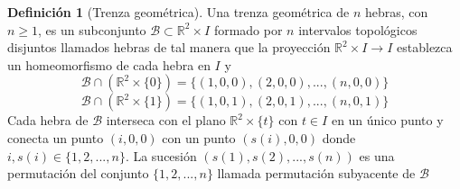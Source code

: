 \documentclass[12pt]{article}
\theoremstyle{definition}
\newtheorem{defi}{Definición}[section]
\begin{document}
\begin{comment}
\begin{defi}[movimiento elemental]\label{mov_elem}
Supongamos que $\mathbb{D}$ es el cubo unidad y que dentro de este cubo hay un número de cadenas como las definidas en la Definición \ref{n_trenza}. (Para el proposito de esta definición, necesitamos restringir y trabajar exclusivamente con la imagen poligonal de una cadena). Sea $\mathit{AB}$ un segmento de la cadena $d$. Sea $\mathit{C}$ un punto en $\mathbb{D}$ tal que el triángulo $\triangle\mathit{ABC}$ (en $\mathbb{D}$) no interseca a ninguna otra cadena y solo se encuentra con $d$ en $\mathit{AB}$. 
\newline
\newline
Si suponemos que $\mathit{AC}\cup\mathit{CB}$ interseca a todos los planos de nivel $E_s$ con $s\in[0,1]$ como mucho en un punto entonces a la operación de reemplazar $AB$ por $\mathit{AC}\cup\mathit{CB}$, a la cual notaremos por $\Omega$, se le denomina \textit{movimiento elemental}. También podemos realizar la operación inversa, sustituyento $\mathit{AC}\cup\mathit{CB}$ por $AB$, a la que notamos por $\Omega^{-1}$.

\end{defi}

\begin{defi}[Equivalencia de trenzas]\label{eq_trenzas}
Decimos que dos $n$-trenzas, $\beta$ y $\beta'$, son equivalentes si se puede transformar $\beta$ en $\beta '$ tras aplicar un número finito de movimientos elementales sobre $\beta$. Denotamos esta equivalencia como $\beta \sim \beta'$.
\end{defi}

\end{comment}

\begin{defi}[Trenza geométrica]\label{trenza_geom}
Una trenza geométrica de $n$ hebras, con $n \geq 1$, es un subconjunto $\mathcal{B}\subset\mathbb{R}^2\times I$ formado por $n$ intervalos topológicos disjuntos llamados hebras de tal manera que la proyección $\mathbb{R}^2\times I\rightarrow I$ establezca un homeomorfismo de cada hebra en $I$ y
$$$$
$$\mathcal{B}\cap(\mathbb{R}^2\times \{0\})=\{(1,0,0),(2,0,0),...,(n,0,0)\}$$
$$\mathcal{B}\cap(\mathbb{R}^2\times \{1\})=\{(1,0,1),(2,0,1),...,(n,0,1)\}$$
$$$$
Cada hebra de $\mathcal{B}$ interseca con el plano $\mathbb{R}^2\times \{t\}$ con $t\in I$ en un único punto y conecta un punto $(i,0,0)$ con un punto $(s(i),0,0)$ donde $i,s(i)\in\{1,2,...,n\}$. La sucesión $(s(1),s(2),...,s(n))$ es una permutación del conjunto $\{1,2,...,n\}$ llamada permutación subyacente de $\mathcal{B}$
\end{defi}
\end{document}
